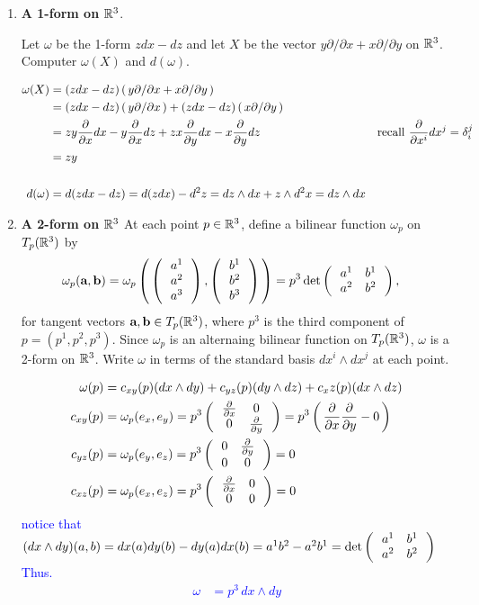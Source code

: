 \documentclass[10pt,a4paper]{report}
\newcommand{\BLUE}[1]{\textcolor{blue}{#1}}
\begin{document}
\begin{enumerate}[label=4.\arabic*]
\item \textbf{A 1-form on $\mathbb{R}^3$}.

Let $\omega$ be the 1-form $zdx-dz$ and let $X$ be the vector $y\partial/\partial x +  x\partial/\partial y$ on $\mathbb{R}^3$.  Computer $\omega(X)$ and $d(\omega)$.

\BLUE{\begin{align*}
	\omega(X) &= (zdx-dz)\left (\, y\partial/\partial x +  x\partial/\partial y \,\right ) \\
	&= (zdx-dz)\left (\, y\partial/\partial x \,\right ) + (zdx-dz)\left (\,  x\partial/\partial y \,\right ) \\
	&= zy \frac{\partial }{\partial x}dx - y\frac{\partial }{\partial x}dz + zx\frac{\partial }{\partial y}dx -x\frac{\partial }{\partial y}dz &\text{recall } \frac{\partial }{\partial x^i}dx^j = \delta_i^j \\
	&= zy \\ \\
	d(\omega) &= d(zdx-dz) = d(zdx)-d^2z = dz\wedge dx + z\wedge d^2x = dz \wedge dx
\end{align*}
}

\item \textbf{A 2-form on $\mathbb{R}^3$}
\newcommand{\AAA}{\textbf{a}}
\newcommand{\BBB}{\textbf{b}}
At each point $p \in \mathbb{R}^3$, define a bilinear function $\omega_p$ on $T_p(\mathbb{R}^3)$ by
\begin{align*}
	\omega_p(\AAA,\BBB) &= \omega_p\PAREN{\COLVECTOR{a^1\\a^2\\a^3},\COLVECTOR{b^1\\b^2\\b^3}} = p^3 \det\TWOXTWO{a^1}{b^1}{a^2}{b^2},
\end{align*}for tangent vectors $\AAA,\BBB \in T_p(\R^3)$, where $p^3$ is the third component of $p=(p^1,p^2,p^3)$.  Since $\omega_p$ is an alternaing bilinear function on $T_p(\mathbb{R}^3)$, $\omega$ is a 2-form on $\mathbb{R}^3$.  Write $\omega$ in terms of the standard basis $dx^i\wedge dx^j$ at each point.

\BLUE{\begin{align*}
	\omega(p) &= c_{xy}(p)(dx\wedge dy)+c_{yz}(p)(dy\wedge dz)+c_xz(p)(dx\wedge dz) \\
	c_{xy}(p) &= \omega_p(e_x,e_y) = p^3 \left (\,  \begin{array}{c c} \frac{\partial }{\partial x}&0 \\ 0 & \frac{\partial }{\partial y} \end{array}  \,\right ) = p^3\left (\, \frac{\partial }{\partial x}\frac{\partial }{\partial y}-0 \,\right ) \\
	c_{yz}(p) &= \omega_p(e_y,e_z) = p^3 \left (\,  \begin{array}{c c} 0&\frac{\partial }{\partial y} \\ 0 & 0 \end{array}  \,\right ) = 0  \\
	c_{xz}(p) &= \omega_p(e_x,e_z) = p^3 \left (\,  \begin{array}{c c} \frac{\partial }{\partial x}&0 \\ 0 & 0 \end{array}  \,\right ) = 0 
\end{align*}notice that $(dx\wedge dy)(a,b) = dx(a)dy(b)-dy(a)dx(b)= a^1b^2-a^2b^1 = \det\left (\,  \begin{array}{c c} a^1&b^1 \\ a^2 & b^2 \end{array}  \,\right )$ Thus.
\begin{align*}
	\omega &= p^3\, dx\wedge dy
\end{align*}
}


\end{enumerate}
\end{document}
